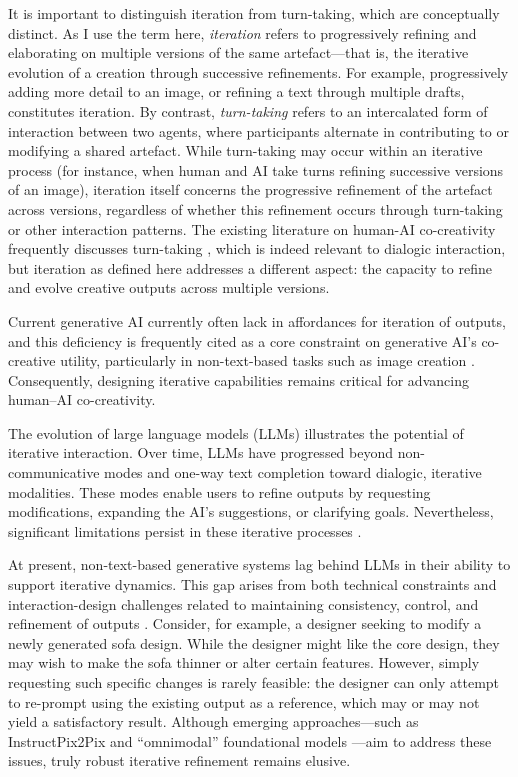 It is important to distinguish iteration from turn-taking, which are conceptually distinct. As I use the term here, \textit{iteration} refers to progressively refining and elaborating on multiple versions of the same artefact—that is, the iterative evolution of a creation through successive refinements. For example, progressively adding more detail to an image, or refining a text through multiple drafts, constitutes iteration. By contrast, \textit{turn-taking} refers to an intercalated form of interaction between two agents, where participants alternate in contributing to or modifying a shared artefact. While turn-taking may occur within an iterative process (for instance, when human and AI take turns refining successive versions of an image), iteration itself concerns the progressive refinement of the artefact across versions, regardless of whether this refinement occurs through turn-taking or other interaction patterns. The existing literature on human-AI co-creativity frequently discusses turn-taking \citep{Kantosalo2020-nh, Lin2023-jd, Rezwana2022-gg}, which is indeed relevant to dialogic interaction, but iteration as defined here addresses a different aspect: the capacity to refine and evolve creative outputs across multiple versions.

Current generative AI currently often lack in affordances for iteration of outputs, and this deficiency is frequently cited as a core constraint on generative AI's co-creative utility, particularly in non-text-based tasks such as image creation \citep{Park2024-gw, Ocampo2023-gu, Peng2024-tr}. Consequently, designing iterative capabilities remains critical for advancing human–AI co-creativity.

The evolution of large language models (LLMs) illustrates the potential of iterative interaction. Over time, LLMs have progressed beyond non-communicative modes and one-way text completion toward dialogic, iterative modalities. These modes enable users to refine outputs by requesting modifications, expanding the AI's suggestions, or clarifying goals. Nevertheless, significant limitations persist in these iterative processes \citep{Bown2024-yx, Ocampo2024-dv}.

At present, non-text-based generative systems lag behind LLMs in their ability to support iterative dynamics. This gap arises from both technical constraints and interaction-design challenges related to maintaining consistency, control, and refinement of outputs \citep{Ocampo2024-dv}. Consider, for example, a designer seeking to modify a newly generated sofa design. While the designer might like the core design, they may wish to make the sofa thinner or alter certain features. However, simply requesting such specific changes is rarely feasible: the designer can only attempt to re-prompt using the existing output as a reference, which may or may not yield a satisfactory result. Although emerging approaches—such as InstructPix2Pix \citep{Brooks2022-vo} and ``omnimodal'' foundational models \citep{Pichai2024-ao}—aim to address these issues, truly robust iterative refinement remains elusive.

